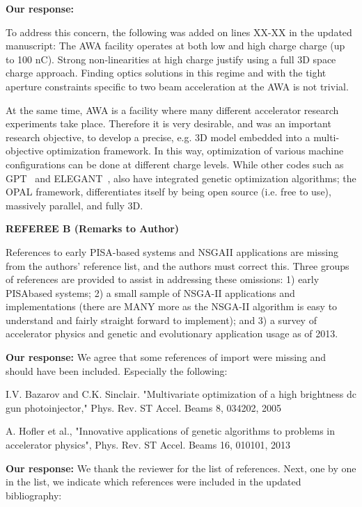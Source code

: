 \documentclass{article}
\begin{document}
{\bf Our response:} {\color{blue} 
	To address this concern, the following was added on lines XX-XX in the updated manuscript:
	The AWA facility operates at both low and high charge charge (up to 100 nC). Strong non-linearities
at high charge justify using a full 3D space charge approach. Finding optics solutions in this regime and 
with the tight aperture constraints specific to two beam acceleration at the AWA is not trivial.  

At the same time, AWA is a facility where many different accelerator research experiments take
place. Therefore it is very desirable, and was an important research objective, to develop a precise, e.g. 3D
model embedded into a multi-objective optimization framework. In this way, optimization of various 
machine configurations can be done at different charge levels. While other codes such as GPT~\cite{gpt} and ELEGANT~\cite{borl:00}, also have integrated genetic optimization algorithms; the OPAL framework, differentiates itself by being open source (i.e. free to use), massively parallel, and fully 3D.
}



{\bf REFEREE B (Remarks to Author)}

References to early PISA-based systems and NSGAII applications
are missing from the authors’ reference list, and the authors must
correct this. Three groups of references are provided to assist in
addressing these omissions: 1) early PISAbased systems; 2) a small
sample of NSGA-II applications and implementations (there are MANY
more as the NSGA-II algorithm is easy to understand and fairly
straight forward to implement); and 3) a survey of accelerator physics
and genetic and evolutionary application usage as of 2013.

{\bf Our response:} {\color{blue} We agree that some references of import were missing and should have been included.
	Especially the following: }
	
	I.V. Bazarov and C.K. Sinclair. "Multivariate optimization of a high
	brightness dc gun photoinjector," Phys. Rev. ST Accel. Beams 8,
	034202, 2005
	
	A. Hofler et al., "Innovative applications of genetic algorithms to
	problems in accelerator physics", Phys. Rev. ST Accel. Beams 16,
	010101, 2013
	
{\bf Our response:} {\color{blue} 	We thank the reviewer for the list of references. 
	Next, one by one in the list, we indicate which references were included in the updated bibliography: 
}
\end{document}
